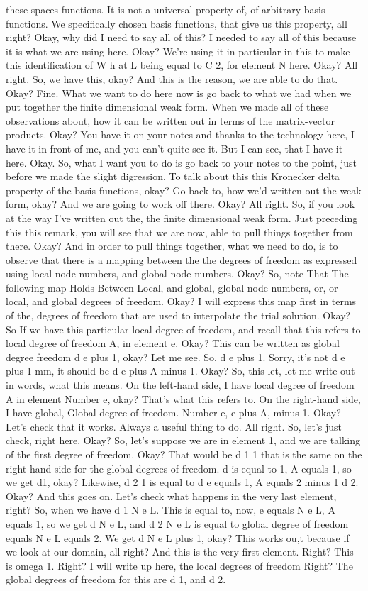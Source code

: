 \documentclass[10pt]{article}
\begin{document}
these spaces functions. It is not a universal property of, of arbitrary basis functions. We specifically chosen basis functions, that give us this property, all right? Okay, why did I need to say all of this? I needed to say all of this because it is what we are using here. Okay? We're using it in particular in this to make this identification of W h at L being equal to C 2, for element N here. Okay? All right. So, we have this, okay? And this is the reason, we are able to do that. Okay? Fine. What we want to do here now is go back to what we had when we put together the finite dimensional weak form. When we made all of these observations about, how it can be written out in terms of the matrix-vector products. Okay? You have it on your notes and thanks to the technology here, I have it in front of me, and you can't quite see it. But I can see, that I have it here. Okay. So, what I want you to do is go back to your notes to the point, just before we made the slight digression. To talk about this this Kronecker delta property of the basis functions, okay? Go back to, how we'd written out the weak form, okay? And we are going to work off there. Okay? All right. So, if you look at the way I've written out the, the finite dimensional weak form. Just preceding this this remark, you will see that we are now, able to pull things together from there. Okay? And in order to pull things together, what we need to do, is to observe that there is a mapping between the the degrees of freedom as expressed using local node numbers, and global node numbers. Okay? So, note That The following map Holds Between Local, and global, global node numbers, or, or local, and global degrees of freedom. Okay? I will express this map first in terms of the, degrees of freedom that are used to interpolate the trial solution. Okay? So If we have this particular local degree of freedom, and recall that this refers to local degree of freedom A, in element e. Okay? This can be written as global degree freedom d e plus 1, okay? Let me see. So, d e plus 1. Sorry, it's not d e plus 1 mm, it should be d e plus A minus 1. Okay? So, this let, let me write out in words, what this means. On the left-hand side, I have local degree of freedom A in element Number e, okay? That's what this refers to. On the right-hand side, I have global, Global degree of freedom. Number e, e plus A, minus 1. Okay? Let's check that it works. Always a useful thing to do. All right. So, let's just check, right here. Okay? So, let's suppose we are in element 1, and we are talking of the first degree of freedom. Okay? That would be d 1 1 that is the same on the right-hand side for the global degrees of freedom. d is equal to 1, A equals 1, so we get d1, okay? Likewise, d 2 1 is equal to d e equals 1, A equals 2 minus 1 d 2. Okay? And this goes on. Let's check what happens in the very last element, right? So, when we have d 1 N e L. This is equal to, now, e equals N e L, A equals 1, so we get d N e L, and d 2 N e L is equal to global degree of freedom equals N e L equals 2. We get d N e L plus 1, okay? This works ou,t because if we look at our domain, all right? And this is the very first element. Right? This is omega 1. Right? I will write up here, the local degrees of freedom Right? The global degrees of freedom for this are d 1, and d 2. 
\end{document}

